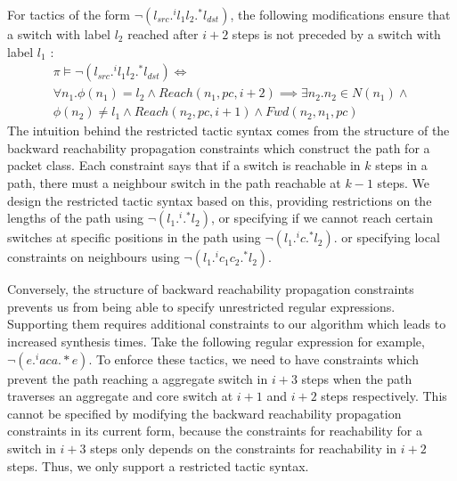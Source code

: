 For tactics of the form $\neg (l_{src}  .^i l_1 l_2 .^* l_{dst})$, the following modifications 
ensure that a switch with label $l_2$ reached after $i + 2$ steps is not preceded by a switch with label $l_1$ : 
\begin{multline} \label{eq:t3}
\pi \vDash \neg (l_{src} .^i l_1 l_2 .^* l_{dst}) \Leftrightarrow \\ 
\forall n_1. \phi(n_1) = l_2 \wedge Reach(n_1,pc,i + 2) \implies \exists n_2.  n_2 \in N(n_1) \wedge \\ \phi(n_2) \not= l_1 \wedge 
Reach(n_2,pc,i+1) \wedge Fwd(n_2,n_1,pc)
\end{multline}
The intuition behind the restricted tactic syntax comes from the structure of the backward reachability propagation 
constraints which construct the path for a packet class. Each constraint says that if a switch is reachable in $k$ steps in a path,
 there must a neighbour switch in the path reachable at $k-1$ steps. We design the restricted tactic syntax based
  on this, providing restrictions on the lengths of the path using $\neg (l_1 .^i .^* l_2)$, or specifying if we cannot 
  reach certain switches at specific positions in the path using  $\neg (l_1 .^i c .^* l_2)$. or specifying local 
  constraints on neighbours using $\neg (l_1  .^i c_1 c_2 .^* l_2)$.  
  
  Conversely, the structure of backward reachability propagation constraints 
  prevents us from being able to specify unrestricted regular expressions. Supporting them
  requires additional constraints to our algorithm which leads to increased synthesis times. 
  Take the following regular expression for example, $\neg(e .^i a c a .*e)$. To enforce
  these tactics, we need to have constraints which prevent the path reaching a aggregate switch in $i+3$
  steps when the path traverses an aggregate and core switch at $i+1$ and $i+2$ steps
  respectively. This cannot be specified by modifying the backward reachability propagation 
  constraints in its current form, 
  because the constraints for reachability for a switch in $i + 3$ steps only depends on 
  the constraints for reachability in $i+2$ steps. Thus, we only support a restricted tactic syntax.   

